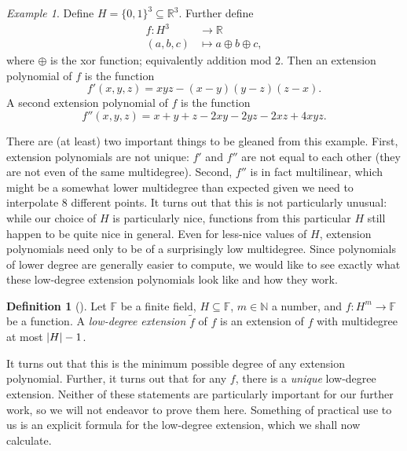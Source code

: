 \documentclass[english,12pt]{reedthesis}
\theoremstyle{plain}
\theoremstyle{definition}
\newtheorem{defn}[defn]{Definition}
\theoremstyle{remark}
\newtheorem{example}{Example}[thm]
\DeclarePairedDelimiter{\abs}{\lvert}{\rvert}
\begin{document}
\begin{example}
  Define $H = \{0, 1\}^{3} \subseteq \mathbb{R}^{3}$. Further define
  \begin{align*}
    f\colon H^{3} &\rightarrow \mathbb{R} \\
    (a, b, c) &\mapsto a \oplus b \oplus c,
  \end{align*}
  where $\oplus$ is the xor function; equivalently addition mod $2$. Then an
  extension polynomial of $f$ is the function
  \begin{equation*}
    f'(x, y, z) = xyz - (x - y)(y - z)(z - x).
  \end{equation*}
  A second extension polynomial of $f$ is the function
  \begin{equation*}
    f''(x, y, z) = x + y + z - 2xy - 2yz - 2xz + 4xyz.
  \end{equation*}
\end{example}

There are (at least) two important things to be gleaned from this example.
First, extension polynomials are not unique: $f'$ and $f''$ are not equal to
each other (they are not even of the same multidegree). Second, $f''$ is in fact
multilinear, which might be a somewhat lower multidegree than expected given we
need to interpolate 8 different points. It turns out that this is not
particularly unusual: while our choice of $H$ is particularly nice, functions
from this particular $H$ still happen to be quite nice in general. Even for
less-nice values of $H$, extension polynomials need only to be of a surprisingly
low multidegree. Since polynomials of lower degree are generally easier to
compute, we would like to see exactly what these low-degree extension
polynomials look like and how they work.

\begin{defn}[{\cite[]{CFGS22}}]\label{def:low-deg-ext}
  Let $\mathbb{F}$ be a finite field, $H \subseteq \mathbb{F}$, $m \in \mathbb{N}$ a number, and
  $f\colon H^{m} \rightarrow \mathbb{F}$ be a function. A \emph{low-degree extension}
  $\tilde{f}$ of $f$ is an extension of $f$ with multidegree at most
  $\abs{H} - 1$.
\end{defn}

It turns out that this is the minimum possible degree of any extension
polynomial. Further, it turns out that for any $f$, there is a \emph{unique}
low-degree extension. Neither of these statements are particularly important for
our further work, so we will not endeavor to prove them here. Something of
practical use to us is an explicit formula for the low-degree extension, which
we shall now calculate.
\end{document}
